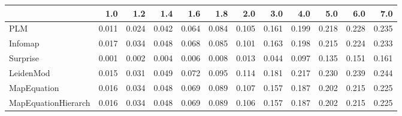 \begin{tabular}{lrrrrrrrrrrr}
\toprule
{} &   1.0 &   1.2 &   1.4 &   1.6 &   1.8 &   2.0 &   3.0 &   4.0 &   5.0 &   6.0 &   7.0 \\
\midrule
PLM                 & 0.011 & 0.024 & 0.042 & 0.064 & 0.084 & 0.105 & 0.161 & 0.199 & 0.218 & 0.228 & 0.235 \\
Infomap             & 0.017 & 0.034 & 0.048 & 0.068 & 0.085 & 0.101 & 0.163 & 0.198 & 0.215 & 0.224 & 0.233 \\
Surprise            & 0.001 & 0.002 & 0.004 & 0.006 & 0.008 & 0.013 & 0.044 & 0.097 & 0.135 & 0.151 & 0.161 \\
LeidenMod           & 0.015 & 0.031 & 0.049 & 0.072 & 0.095 & 0.114 & 0.181 & 0.217 & 0.230 & 0.239 & 0.244 \\
MapEquation         & 0.016 & 0.034 & 0.048 & 0.069 & 0.089 & 0.107 & 0.157 & 0.187 & 0.202 & 0.215 & 0.225 \\
MapEquationHierarch & 0.016 & 0.034 & 0.048 & 0.069 & 0.089 & 0.106 & 0.157 & 0.187 & 0.202 & 0.215 & 0.225 \\
\bottomrule
\end{tabular}
